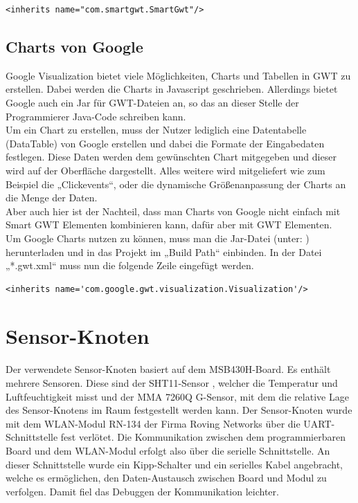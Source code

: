 \documentclass[12pt,a4paper,twoside]{article}
\begin{document}
\lstset{language=HTML}
\begin{lstlisting}
<inherits name="com.smartgwt.SmartGwt"/>
\end{lstlisting}

\subsection{Charts von Google}
Google Visualization bietet viele Möglichkeiten, Charts und Tabellen in GWT zu erstellen. Dabei werden die Charts in Javascript geschrieben. Allerdings bietet Google auch ein Jar für GWT-Dateien an, so das an dieser Stelle der Programmierer Java-Code schreiben kann. \\
Um ein Chart zu erstellen, muss der Nutzer lediglich eine Datentabelle (DataTable) von Google erstellen und dabei die Formate der Eingabedaten festlegen. Diese Daten werden dem gewünschten Chart mitgegeben und dieser wird auf der Oberfläche dargestellt. Alles weitere wird mitgeliefert wie zum Beispiel die „Clickevents“, oder die dynamische Größenanpassung der Charts an die Menge der Daten.\\
Aber auch hier ist der Nachteil, dass man Charts von Google nicht einfach mit Smart GWT Elementen kombinieren kann, dafür aber mit GWT Elementen.\\
\newline
Um Google Charts nutzen zu können, muss man die Jar-Datei (unter: \cite{charts}) herunterladen und in das Projekt im „Build Path“ einbinden. In der Datei „*.gwt.xml“ muss nun die folgende Zeile eingefügt werden.
\lstset{language=HTML}
\begin{lstlisting}
<inherits name='com.google.gwt.visualization.Visualization'/>
\end{lstlisting}

\section{Sensor-Knoten}
Der verwendete Sensor-Knoten basiert auf dem MSB430H-Board. Es enthält mehrere Sensoren. Diese sind der SHT11-Sensor , welcher die Temperatur und Luftfeuchtigkeit misst und der MMA 7260Q G-Sensor, 
mit dem die relative Lage des Sensor-Knotens im Raum festgestellt werden kann. Der Sensor-Knoten wurde mit dem WLAN-Modul RN-134 der Firma Roving Networks über die UART-Schnittstelle fest verlötet. 
Die Kommunikation zwischen dem programmierbaren Board und dem WLAN-Modul erfolgt also über die serielle Schnittstelle. An dieser Schnittstelle wurde ein Kipp-Schalter und  ein serielles Kabel angebracht, 
welche es ermöglichen, den Daten-Austausch zwischen Board und Modul zu verfolgen. Damit fiel das Debuggen der Kommunikation leichter.
\end{document}
